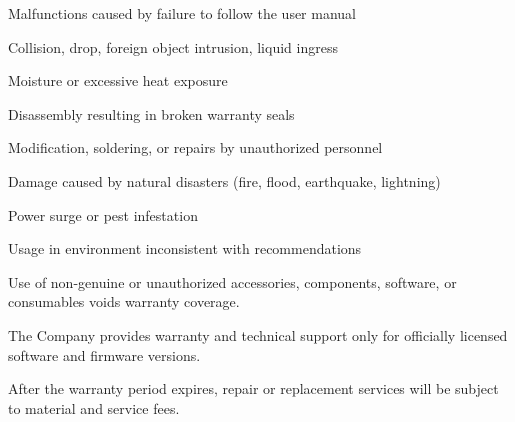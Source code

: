 \documentclass[11pt,a4paper]{article}
\begin{document}

\begin{tbkList}
  \item Malfunctions caused by failure to follow the user manual
  \item Collision, drop, foreign object intrusion, liquid ingress
  \item Moisture or excessive heat exposure
  \item Disassembly resulting in broken warranty seals
  \item Modification, soldering, or repairs by unauthorized personnel
\end{tbkList}


\begin{tbkList}
  \item Damage caused by natural disasters (fire, flood, earthquake, lightning)
  \item Power surge or pest infestation
  \item Usage in environment inconsistent with recommendations
\end{tbkList}

\begin{tbkSpecTable}[caption={Recommended Operating Environment}]
\end{tbkSpecTable}



Use of non-genuine or unauthorized accessories, components, software, or
consumables voids warranty coverage.


The Company provides warranty and technical support only for officially licensed
software and firmware versions.


After the warranty period expires, repair or replacement services will be subject
to material and service fees.
\end{document}
